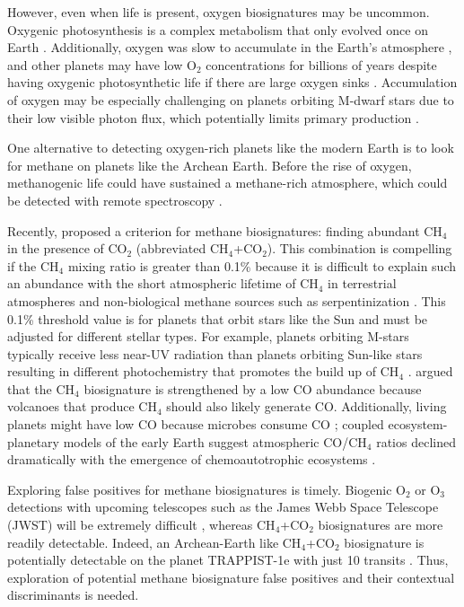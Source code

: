 However, even when life is present, oxygen biosignatures may be uncommon. Oxygenic photosynthesis is a complex metabolism that only evolved once on Earth \citep{Fischer_2016}. Additionally, oxygen was slow to accumulate in the Earth's atmosphere \citep{Lyons_2014}, and other planets may have low O$_2$ concentrations for billions of years despite having oxygenic photosynthetic life if there are large oxygen sinks \citep{Claire_2006}. Accumulation of oxygen may be especially challenging on planets orbiting M-dwarf stars due to their low visible photon flux, which potentially limits primary production \citep{Lehmer_2018}.

One alternative to detecting oxygen-rich planets like the modern Earth is to look for methane on planets like the Archean Earth. Before the rise of oxygen, methanogenic life could have sustained a methane-rich atmosphere, which could be detected with remote spectroscopy \citep{Kasting_2003,Schindler_2000}. 

Recently, \citet{KrissansenTotton_2018_diseq} proposed a criterion for methane biosignatures: finding abundant CH$_4$ in the presence of CO$_2$ (abbreviated CH$_4$+CO$_2$). This combination is compelling if the CH$_4$ mixing ratio is greater than 0.1\% because it is difficult to explain such an abundance with the short atmospheric lifetime of CH$_4$ in terrestrial atmospheres and non-biological methane sources such as serpentinization \citep{KrissansenTotton_2018_diseq}. This 0.1\% threshold value is for planets that orbit stars like the Sun and must be adjusted for different stellar types. For example, planets orbiting M-stars typically receive less near-UV radiation than planets orbiting Sun-like stars resulting in different photochemistry that promotes the build up of CH$_4$ \citep{Segura_2005,Grenfell_2007,Grenfell_2014,Rugheimer_2015,Rugheimer_2018}. \citet{KrissansenTotton_2018_diseq} argued that the CH$_4$ biosignature is strengthened by a low CO abundance because volcanoes that produce CH$_4$ should also likely generate CO. Additionally, living planets might have low CO because microbes consume CO \citep{Kharecha_2005}; coupled ecosystem-planetary models of the early Earth suggest atmospheric CO/CH$_4$ ratios declined dramatically with the emergence of chemoautotrophic ecosystems \citep{Sauterey_2020}.

Exploring false positives for methane biosignatures is timely. Biogenic O$_2$ or O$_3$ detections with upcoming telescopes such as the James Webb Space Telescope (JWST) will be extremely difficult \citep{Barstow_2016,KrissansenTotton_2018_detect,Lustig-Yaeger_2019,Wunderlich_2020,Fauchez_2019}, whereas CH$_4$+CO$_2$ biosignatures are more readily detectable. Indeed, an Archean-Earth like CH$_4$+CO$_2$ biosignature is potentially detectable on the planet TRAPPIST-1e with just 10 transits \citep{KrissansenTotton_2018_detect}. Thus, exploration of potential methane biosignature false positives and their contextual discriminants is needed.


